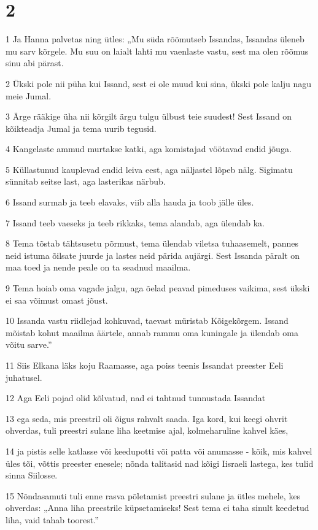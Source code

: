 \chapter{2}

\par 1 Ja Hanna palvetas ning ütles: „Mu süda rõõmutseb Issandas, Issandas üleneb mu sarv kõrgele. Mu suu on laialt lahti mu vaenlaste vastu, sest ma olen rõõmus sinu abi pärast.
\par 2 Ükski pole nii püha kui Issand, sest ei ole muud kui sina, ükski pole kalju nagu meie Jumal.
\par 3 Ärge rääkige üha nii kõrgilt ärgu tulgu ülbust teie suudest! Sest Issand on kõikteadja Jumal ja tema uurib tegusid.
\par 4 Kangelaste ammud murtakse katki, aga komistajad vöötavad endid jõuga.
\par 5 Küllastunud kauplevad endid leiva eest, aga näljastel lõpeb nälg. Sigimatu sünnitab seitse last, aga lasterikas närbub.
\par 6 Issand surmab ja teeb elavaks, viib alla hauda ja toob jälle üles.
\par 7 Issand teeb vaeseks ja teeb rikkaks, tema alandab, aga ülendab ka.
\par 8 Tema tõstab tähtsusetu põrmust, tema ülendab viletsa tuhaasemelt, pannes neid istuma õilsate juurde ja lastes neid pärida aujärgi. Sest Issanda päralt on maa toed ja nende peale on ta seadnud maailma.
\par 9 Tema hoiab oma vagade jalgu, aga õelad peavad pimeduses vaikima, sest ükski ei saa võimust omast jõust.
\par 10 Issanda vastu riidlejad kohkuvad, taevast müristab Kõigekõrgem. Issand mõistab kohut maailma äärtele, annab rammu oma kuningale ja ülendab oma võitu sarve.”
\par 11 Siis Elkana läks koju Raamasse, aga poiss teenis Issandat preester Eeli juhatusel.
\par 12 Aga Eeli pojad olid kõlvatud, nad ei tahtnud tunnustada Issandat
\par 13 ega seda, mis preestril oli õigus rahvalt saada. Iga kord, kui keegi ohvrit ohverdas, tuli preestri sulane liha keetmise ajal, kolmeharuline kahvel käes,
\par 14 ja pistis selle katlasse või keedupotti või patta või anumasse - kõik, mis kahvel üles tõi, võttis preester enesele; nõnda talitasid nad kõigi Iisraeli lastega, kes tulid sinna Siilosse.
\par 15 Nõndasamuti tuli enne rasva põletamist preestri sulane ja ütles mehele, kes ohverdas: „Anna liha preestrile küpsetamiseks! Sest tema ei taha sinult keedetud liha, vaid tahab toorest.”
